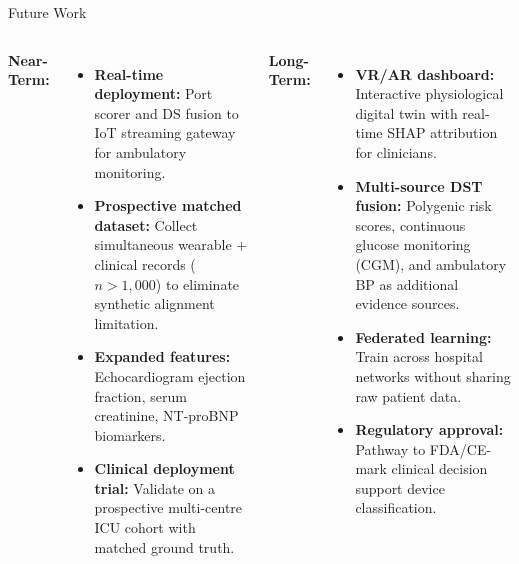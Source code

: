 \documentclass[aspectratio=169]{beamer}
\begin{document}
\begin{frame}{Future Work}
  \begin{columns}[T]
      \textbf{Near-Term:}
      \begin{itemize}\small
        \item \textbf{Real-time deployment:} Port scorer and DS fusion
              to IoT streaming gateway for ambulatory monitoring.
        \item \textbf{Prospective matched dataset:} Collect simultaneous
              wearable + clinical records ($n{>}1{,}000$) to eliminate
              synthetic alignment limitation.
        \item \textbf{Expanded features:} Echocardiogram ejection fraction,
              serum creatinine, NT-proBNP biomarkers.
        \item \textbf{Clinical deployment trial:} Validate on a prospective
              multi-centre ICU cohort with matched ground truth.
      \end{itemize}
      \textbf{Long-Term:}
      \begin{itemize}\small
        \item \textbf{VR/AR dashboard:} Interactive physiological digital
              twin with real-time SHAP attribution for clinicians.
        \item \textbf{Multi-source DST fusion:} Polygenic risk scores,
              continuous glucose monitoring (CGM), and ambulatory BP
              as additional evidence sources.
        \item \textbf{Federated learning:} Train across hospital networks
              without sharing raw patient data.
        \item \textbf{Regulatory approval:} Pathway to FDA/CE-mark
              clinical decision support device classification.
      \end{itemize}
  \end{columns}
\end{frame}


\end{document}
